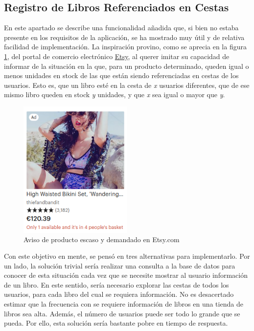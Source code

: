 \documentclass[a4paper]{article}
\begin{document}
    \subsection[Libros Referenciados ]{Registro de Libros Referenciados en Cestas}
    En este apartado se describe una funcionalidad añadida que, si bien no estaba presente en los requisitos de la aplicación, se ha mostrado muy útil y de relativa facilidad de implementación. La inspiración provino, como se aprecia en la figura \ref{fig:etsy}, del portal de comercio electrónico \href{https://www.etsy.com}{Etsy}, al querer imitar su capacidad de informar de la situación en la que, para un producto determinado, queden igual o menos unidades en stock de las que están siendo referenciadas en cestas de los usuarios. Esto es, que un libro esté en la cesta de \emph{x} usuarios diferentes, que de ese mismo libro queden en stock \emph{y} unidades, y que \emph{x} sea igual o mayor que \emph{y}.
    
    \begin{figure}[htb!]
    	\centering
    	\includegraphics[width=0.5\textwidth]{etsy}
    	\caption{Aviso de producto escaso y demandado en Etsy.com}
    	\label{fig:etsy}
    \end{figure}
    
    Con este objetivo en mente, se pensó en tres alternativas para implementarlo. Por un lado, la solución trivial sería realizar una consulta a la base de datos para conocer de esta situación cada vez que se necesite mostrar al usuario información de un libro. En este sentido, sería necesario explorar las cestas de todos los usuarios, para cada libro del cual se requiera información. No es desacertado estimar que la frecuencia con se requiere información de libros en una tienda de libros sea alta. Además, el número de usuarios puede ser todo lo grande que se pueda. Por ello, esta solución sería bastante pobre en tiempo de respuesta.
    
\end{document}
